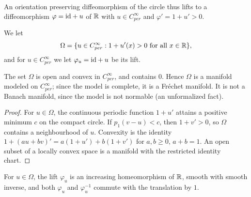 An orientation preserving diffeomorphism of the circle thus lifts to a diffeomorphism
$\varphi = \mathrm{id} + u$ of $\mathbb{R}$ with $u \in C^\infty_{per}$ and $\varphi' = 1 + u' > 0$.

\begin{definition}
  \label{def:ex-omega}
  \leanok
  We let
  \[
    \Omega = \{u \in C^\infty_{per} : 1 + u'(x) > 0 \text{ for all } x \in \mathbb{R}\},
  \]
  and for $u \in C^\infty_{per}$ we let $\varphi_u = \mathrm{id} + u$ be its lift.
\end{definition}

\begin{proposition}
  \label{prop:ex-omega-open}
  \leanok
  The set $\Omega$ is open and convex in $C^\infty_{per}$, and contains $0$. Hence $\Omega$ is a
  manifold modeled on $C^\infty_{per}$; since the model is complete, it is a Fréchet manifold.
  It is not a Banach manifold, since the model is not normable (an unformalized fact).
\end{proposition}

\begin{proof}
  \leanok
  For $u \in \Omega$, the continuous periodic function $1 + u'$ attains a positive minimum $c$ on
  the compact circle. If $p_1(v - u) < c$, then $1 + v' > 0$, so $\Omega$ contains a
  neighbourhood of $u$. Convexity is the identity
  $1 + (au + bv)' = a(1 + u') + b(1 + v')$ for $a, b \ge 0$, $a + b = 1$. An open subset of a
  locally convex space is a manifold with the restricted identity chart.
\end{proof}

\begin{proposition}
  \label{prop:ex-lift-diffeo}
  \leanok
  For $u \in \Omega$, the lift $\varphi_u$ is an increasing homeomorphism of $\mathbb{R}$, smooth with
  smooth inverse, and both $\varphi_u$ and $\varphi_u^{-1}$ commute with the translation by $1$.
\end{proposition}

